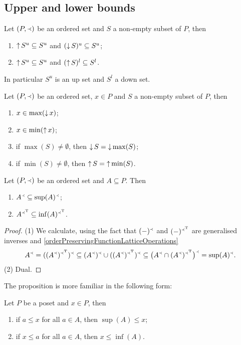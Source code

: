\subsection{Upper and lower bounds}

\begin{lemma} \label{upperBoundUpsetLowerBoundDownset}
Let $(P,\Yleft)$ be an ordered set and $S$ a non-empty subset of $P$, then
\begin{enumerate}
\item $\operatorname{\uparrow} S^u \subseteq S^u$ and $(\operatorname{\downarrow} S)^u \subseteq S^u$;
\item $\operatorname{\uparrow} S^u \subseteq S^u$ and $(\operatorname{\uparrow} S)^l \subseteq S^l$.
\end{enumerate}
\end{lemma}
In particular $S^u$ is an up set and $S^l$ a down set.
\begin{corollary} \label{minMaxUpsetDownset}
Let $(P,\Yleft)$ be an ordered set, $x\in P$ and $S$ a non-empty subset of $P$, then
\begin{enumerate}
\item $x \in \max(\operatorname{\downarrow} x)$;
\item $x \in \min(\operatorname{\uparrow} x)$;
\item if $\max(S)\neq \emptyset$, then $\operatorname{\downarrow} S = \operatorname{\downarrow} \max(S)$;
\item if $\min(S)\neq \emptyset$, then $\operatorname{\uparrow} S = \operatorname{\uparrow} \min(S)$.
\end{enumerate}
\end{corollary}


\begin{proposition} \label{supInfPreserveOrder}
Let $(P,\Yleft)$ be an ordered set and $A\subseteq P$. Then
\begin{enumerate}
\item $A^\Yleft \subseteq \sup(A)^\Yleft$;
\item $A^{\Yleft^{\mathrm{T}}} \subseteq \inf(A)^{\Yleft^{\mathrm{T}}}$.
\end{enumerate}
\end{proposition}
\begin{proof}
(1) We calculate, using the fact that $(-)^\Yleft$ and $(-)^{\Yleft^{\mathrm{T}}}$ are generalised inverses and \ref{orderPreservingFunctionLatticeOperations}
\[ A^\Yleft = ((A^\Yleft)^{\Yleft^{\mathrm{T}}})^\Yleft \subseteq (A^{\Yleft})^\Yleft \cup ((A^\Yleft)^{\Yleft^{\mathrm{T}}})^\Yleft \subseteq \big(A^{\Yleft} \cap (A^\Yleft)^{\Yleft^{\mathrm{T}}}\big)^\Yleft = \sup(A)^\Yleft. \]
(2) Dual.
\end{proof}
The proposition is more familiar in the following form:
\begin{corollary}
Let $P$ be a poset and $x\in P$, then
\begin{enumerate}
\item if $a \leq x$ for all $a\in A$, then $\sup(A) \leq x$;
\item if $x \leq a$ for all $a\in A$, then $x\leq \inf(A)$.
\end{enumerate}
\end{corollary}

